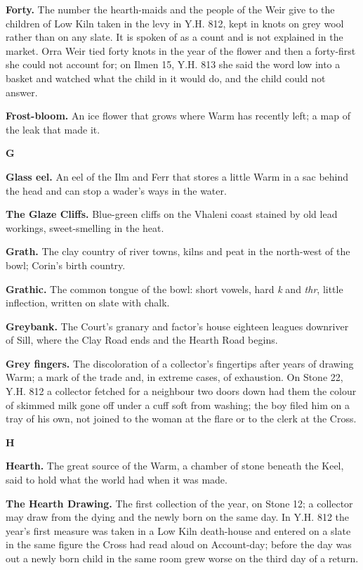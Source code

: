 \documentclass{design/chronicle}
\begin{document}
\textbf{Forty.} The number the hearth-maids and the people of the Weir give to the children of Low Kiln taken in the levy in Y.H. 812, kept in knots on grey wool rather than on any slate. It is spoken of as a count and is not explained in the market. Orra Weir tied forty knots in the year of the flower and then a forty-first she could not account for; on Ilmen 15, Y.H. 813 she said the word low into a basket and watched what the child in it would do, and the child could not answer.

\textbf{Frost-bloom.} An ice flower that grows where Warm has recently left; a map of the leak that made it.

\textbf{G}

\textbf{Glass eel.} An eel of the Ilm and Ferr that stores a little Warm in a sac behind the head and can stop a wader’s ways in the water.

\textbf{The Glaze Cliffs.} Blue-green cliffs on the Vhaleni coast stained by old lead workings, sweet-smelling in the heat.

\textbf{Grath.} The clay country of river towns, kilns and peat in the north-west of the bowl; Corin’s birth country.

\textbf{Grathic.} The common tongue of the bowl: short vowels, hard \emph{k} and \emph{thr}, little inflection, written on slate with chalk.

\textbf{Greybank.} The Court’s granary and factor’s house eighteen leagues downriver of Sill, where the Clay Road ends and the Hearth Road begins.

\textbf{Grey fingers.} The discoloration of a collector’s fingertips after years of drawing Warm; a mark of the trade and, in extreme cases, of exhaustion. On Stone 22, Y.H. 812 a collector fetched for a neighbour two doors down had them the colour of skimmed milk gone off under a cuff soft from washing; the boy filed him on a tray of his own, not joined to the woman at the flare or to the clerk at the Cross.

\textbf{H}

\textbf{Hearth.} The great source of the Warm, a chamber of stone beneath the Keel, said to hold what the world had when it was made.

\textbf{The Hearth Drawing.} The first collection of the year, on Stone 12; a collector may draw from the dying and the newly born on the same day. In Y.H. 812 the year’s first measure was taken in a Low Kiln death-house and entered on a slate in the same figure the Cross had read aloud on Account-day; before the day was out a newly born child in the same room grew worse on the third day of a return.
\end{document}
